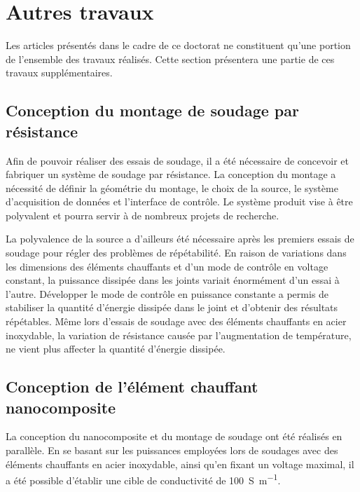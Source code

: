 \label{sec:Discussion}

\section{Autres travaux}

Les articles présentés dans le cadre de ce doctorat ne constituent qu'une portion de l'ensemble des travaux réalisés. 
Cette section présentera une partie de ces travaux supplémentaires. 

\subsection{Conception du montage de soudage par résistance}

Afin de pouvoir réaliser des essais de soudage, il a été nécessaire de concevoir et fabriquer un système de soudage par résistance. 
La conception du montage a nécessité de définir la géométrie du montage, le choix de la source, le système d'acquisition de données et l'interface de contrôle. 
Le système produit vise à être polyvalent et pourra servir à de nombreux projets de recherche. 

La polyvalence de la source a d'ailleurs été nécessaire après les premiers essais de soudage pour régler des problèmes de répétabilité. 
En raison de variations dans les dimensions des éléments chauffants et d'un mode de contrôle en voltage constant, la puissance dissipée dans les joints variait énormément d'un essai à l'autre. 
Développer le mode de contrôle en puissance constante a permis de stabiliser la quantité d'énergie dissipée dans le joint et d'obtenir des résultats répétables. 
Même lors d'essais de soudage avec des éléments chauffants en acier inoxydable, la variation de résistance causée par l'augmentation de température, ne vient plus affecter la quantité d'énergie dissipée. 

\subsection{Conception de l'élément chauffant nanocomposite}

La conception du nanocomposite et du montage de soudage ont été réalisés en parallèle. 
En se basant sur les puissances employées lors de soudages avec des éléments chauffants en acier inoxydable, ainsi qu'en fixant un voltage maximal, il a été possible d'établir une cible de conductivité de \SI{100}{\siemens\per\metre}. 

